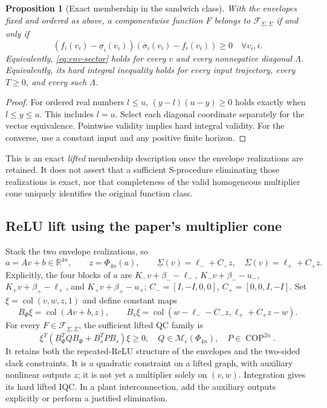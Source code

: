 \documentclass[10pt,a4paper]{article}
\newtheorem{proposition}{Proposition}
\theoremstyle{definition}
\theoremstyle{remark}
\newcommand{\R}{\mathbb R}
\newcommand{\COP}{\operatorname{COP}}
\newcommand{\col}{\operatorname{col}}
\newcommand{\mc}{\mathcal M_c}
\newcommand{\Fenv}{\mathcal F_{\underline\Sigma,\overline\Sigma}}
\begin{document}
\begin{proposition}[Exact membership in the sandwich class]\label{prop:membership}
With the envelopes fixed and ordered as above, a componentwise function $F$ belongs to $\Fenv$ if and only if
\begin{equation}\label{eq:membership-iff}
 (f_i(v_i)-\underline\sigma_i(v_i))
 (\overline\sigma_i(v_i)-f_i(v_i))\ge0\quad\forall v_i,i.
\end{equation}
Equivalently, \eqref{eq:env-sector} holds for every $v$ and every nonnegative diagonal $\Lambda$. Equivalently, its hard integral inequality holds for every input trajectory, every $T\ge0$, and every such $\Lambda$.
\end{proposition}
\begin{proof}
For ordered real numbers $l\le u$, $(y-l)(u-y)\ge0$ holds exactly when $l\le y\le u$. This includes $l=u$. Select each diagonal coordinate separately for the vector equivalence. Pointwise validity implies hard integral validity. For the converse, use a constant input and any positive finite horizon.
\end{proof}
This is an exact \emph{lifted} membership description once the envelope realizations are retained. It does not assert that a sufficient S-procedure eliminating those realizations is exact, nor that completeness of the valid homogeneous multiplier cone uniquely identifies the original function class.

\subsection{ReLU lift using the paper's multiplier cone}
Stack the two envelope realizations, so
\begin{equation}\label{eq:env-lift}
 a=Av+b\in\R^{4n},\qquad z=\Phi_{4n}(a),\qquad
 \underline\Sigma(v)=\ell_-+C_-z,\quad
 \overline\Sigma(v)=\ell_++C_+z.
\end{equation}
Explicitly, the four blocks of $a$ are $K_-v+\beta_--\ell_-$, $K_-v+\beta_--u_-$, $K_+v+\beta_+-\ell_+$, and $K_+v+\beta_+-u_+$; $C_-=[I,-I,0,0]$, $C_+=[0,0,I,-I]$.
Set $\xi=\col(v,w,z,1)$ and define constant maps
\[
 B_\Phi\xi=\col(Av+b,z),\qquad
 B_s\xi=\col(w-\ell_--C_-z,\ell_++C_+z-w).
\]
For every $F\in\Fenv$, the sufficient lifted QC family is
\begin{equation}\label{eq:env-qc-family}
 \boxed{\xi^T\left(B_\Phi^TQB_\Phi+B_s^TPB_s\right)\xi\ge0,
 \quad Q\in\mc(\Phi_{4n}),\quad P\in\COP^{2n}.}
\end{equation}
It retains both the repeated-ReLU structure of the envelopes and the two-sided slack constraints. It is a quadratic constraint on a lifted graph, with auxiliary nonlinear outputs $z$; it is not yet a multiplier solely on $(v,w)$. Integration gives its hard lifted IQC. In a plant interconnection, add the auxiliary outputs explicitly or perform a justified elimination.
\end{document}
